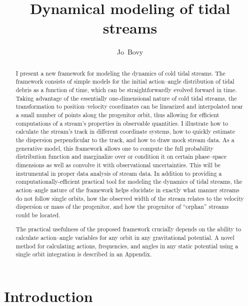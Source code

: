 \documentclass[12pt,preprint]{aastex}
\newcounter{address}
\begin{document}
\title{Dynamical modeling of tidal streams}
\author{Jo~Bovy\altaffilmark{\ref{Hubble}}}

\begin{abstract} 
  I present a new framework for modeling the dynamics of cold tidal
  streams. The framework consists of simple models for the initial
  action--angle distribution of tidal debris as a function of time,
  which can be straightforwardly evolved forward in time. Taking
  advantage of the essentially one-dimensional nature of cold tidal
  streams, the transformation to position--velocity coordinates can be
  linearized and interpolated near a small number of points along the
  progenitor orbit, thus allowing for efficient computations of a
  stream's properties in observable quantities. I illustrate how to
  calculate the stream's track in different coordinate systems, how to
  quickly estimate the dispersion perpendicular to the track, and how
  to draw mock stream data. As a generative model, this framework
  allows one to compute the full probability distribution function and
  marginalize over or condition it on certain phase--space dimensions
  as well as convolve it with observational uncertainties. This will
  be instrumental in proper data analysis of stream data. In addition
  to providing a computationally-efficient practical tool for modeling
  the dynamics of tidal streams, the action--angle nature of the
  framework helps elucidate in exactly what manner streams do not
  follow single orbits, how the observed width of the stream relates
  to the velocity dispersion or mass of the progenitor, and how the
  progenitor of ``orphan'' streams could be located.

  The practical usefulness of the proposed framework crucially depends
  on the ability to calculate action--angle variables for any orbit in
  any gravitational potential. A novel method for calculating actions,
  frequencies, and angles in any static potential using a single orbit
  integration is described in an Appendix.
\end{abstract}



\section{Introduction}
\end{document}
